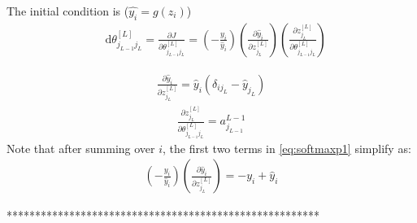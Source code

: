 \documentclass[a4paper,11pt]{article}
\newcommand{\dd}{\text{d}}
\newcommand{\nt}[3]{\theta_{#1 #2}^{[#3]}}
\newcommand{\nt}[4]{\theta_{#1 #2 #3}^{[#4]}}
\begin{document}
The initial condition is ($\hat{y_i} = g(z_i)$)
\begin{eqnarray}
    &\dd \theta^{[L]}_{ j_{L-1} j_L}= \frac{\partial J }{\partial  \nt{j_{L-1}}{j_{L}}{L}  } =
   \left( -  \frac{y_i }{ \hat{y}_i} \right)
   \left(  \frac{ \partial \hat{y}_i}{\partial z_{j_L}^{[L]} }    \right)
   \left(   \frac{ \partial z_{j_L}^{[L]} } {\partial  \nt{j_{L-1}}{j_L}{L}  }  \right)
   \label{eq:softmaxp1}
\end{eqnarray}

\begin{align}
 \frac{ \partial \hat{y}_i}{\partial z_{j_L}^{[L]} } =\hat{y}_i(  \delta_{i j_L} -   \hat{y}_{j_L})
 \label{eq:softmaxp2}
\end{align}
\begin{align}
\frac{ \partial z_{j_L}^{[L]} } {\partial  \nt{j_{L-1}}{j_L}{L}  }  =  a^{L-1}_{j_{L-1}}
\label{eq:softmaxp3}
\end{align}
Note that after summing over $i$, the first two terms in \eqref{eq:softmaxp1} simplify as:
\begin{eqnarray}
   \left( -  \frac{y_i }{ \hat{y}_i} \right) \left(  \frac{ \partial \hat{y}_i}{\partial z_{j_L}^{[L]} }    \right) = - y_i + \hat{y}_i
\end{eqnarray}


*******************************************************
\end{document}
